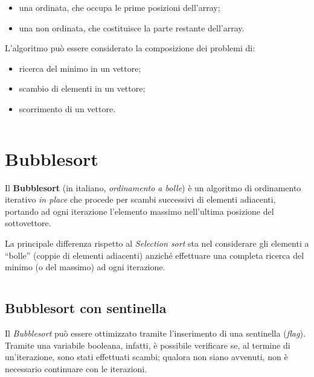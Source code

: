   \begin{itemize}
    \item una ordinata, che occupa le prime posizioni dell'array;
    \item una non ordinata, che costituisce la parte restante dell'array.
  \end{itemize}

  \noindent{} L'algoritmo può essere considerato la composizione dei problemi di:

  \begin{itemize}
    \item ricerca del minimo in un vettore;
    \item scambio di elementi in un vettore;
    \item scorrimento di un vettore.
  \end{itemize}

  \inputminted[firstline=3,lastline=23]{cpp}{./src/main/cpp/Selection.cpp}

  \section{Bubblesort}\label{sec:bubble}

  Il \textbf{Bubblesort} (in italiano, \textit{ordinamento a bolle})
  è un algoritmo di ordinamento iterativo \textit{in place} che procede per scambi successivi di elementi adiacenti,
  portando ad ogni iterazione l’elemento massimo nell'ultima posizione del sottovettore.

  La principale differenza rispetto al \textit{Selection sort} sta nel considerare gli elementi a ``bolle''
  (coppie di elementi adiacenti) anziché effettuare una completa ricerca del minimo (o del massimo) ad ogni iterazione.

  \inputminted[firstline=3,lastline=19]{cpp}{./src/main/cpp/Bubble.cpp}

  \clearpage

  \subsection{Bubblesort con sentinella}\label{subsec:bubble:flag}

  Il \textit{Bubblesort} può essere ottimizzato tramite l'inserimento di una sentinella (\textit{flag}).
  Tramite una variabile booleana, infatti, è possibile verificare se, al termine di un'iterazione,
  sono stati effettuati scambi; qualora non siano avvenuti, non è necessario continuare con le iterazioni.


